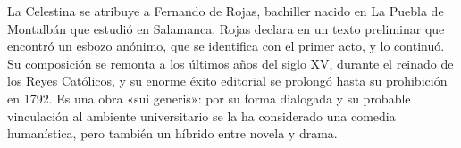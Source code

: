 \documentclass{book}
\begin{document}
La Celestina se atribuye a Fernando de Rojas, bachiller nacido en La Puebla de Montalbán que estudió en Salamanca. Rojas declara en un texto preliminar que encontró un esbozo anónimo, que se identifica con el primer acto, y lo continuó. Su composición se remonta a los últimos años del siglo XV, durante el reinado de los Reyes Católicos, y su enorme éxito editorial se prolongó hasta su prohibición en 1792. Es una obra «sui generis»: por su forma dialogada y su probable vinculación al ambiente universitario se la ha considerado una comedia humanística, pero también un híbrido entre novela y drama.


\par\vspace{\baselineskip}
\end{document}
